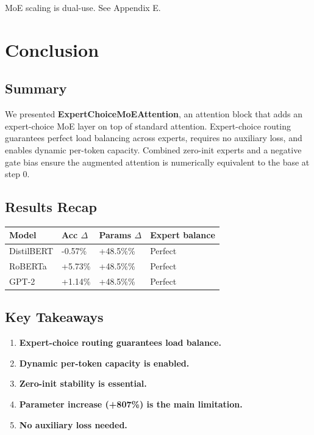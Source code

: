 MoE scaling is dual-use. See Appendix E.



\section{Conclusion}

\subsection{Summary}

We presented \textbf{ExpertChoiceMoEAttention}, an attention block that adds an 
expert-choice MoE layer on top of standard attention. Expert-choice routing 
guarantees perfect load balancing across experts, requires no auxiliary 
loss, and enables dynamic per-token capacity. Combined zero-init experts 
and a negative gate bias ensure the augmented attention is numerically 
equivalent to the base at step 0.

\subsection{Results Recap}

\begin{table}[H]
\centering
\small
\begin{tabular}{llll}
\toprule
\textbf{Model} & \textbf{Acc $\Delta$} & \textbf{Params $\Delta$} & \textbf{Expert balance} \\
\midrule
DistilBERT & -0.57\% & +48.5\%\% & Perfect \\
RoBERTa & +5.73\% & +48.5\%\% & Perfect \\
GPT-2 & +1.14\% & +48.5\%\% & Perfect \\
\bottomrule
\end{tabular}
\end{table}

\subsection{Key Takeaways}

\begin{enumerate}
\item \textbf{Expert-choice routing guarantees load balance.}
\item \textbf{Dynamic per-token capacity is enabled.}
\item \textbf{Zero-init stability is essential.}
\item \textbf{Parameter increase (+807\%) is the main limitation.}
\item \textbf{No auxiliary loss needed.}

\end{enumerate}

